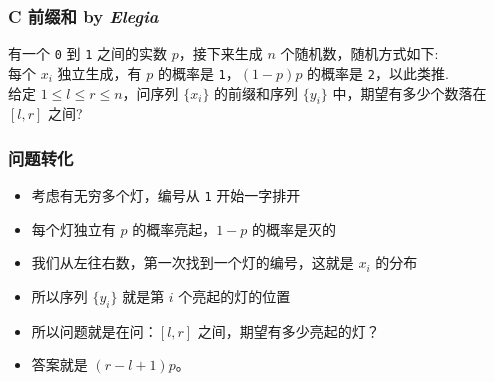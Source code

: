 \frame
{
  \frametitle{C 前缀和 {by \itshape Elegia}}

  有一个 \texttt{0} 到 \texttt{1} 之间的实数 $p$，接下来生成 $n$ 个随机数，随机方式如下:\\
  每个 $x_i$ 独立生成，有 $p$ 的概率是 \texttt{1}，$(1-p)p$ 的概率是 \texttt{2}，以此类推.\\
  给定 $1\le l\le r\le n$，问序列 $\{x_i\}$ 的前缀和序列 $\{y_i\}$ 中，期望有多少个数落在 $[l, r]$ 之间?

}


\frame
{
    \frametitle{问题转化}

  \begin{itemize}
    \item 考虑有无穷多个灯，编号从 \texttt{1} 开始一字排开
    \item 每个灯独立有 $p$ 的概率亮起，$1-p$ 的概率是灭的
    \item 我们从左往右数，第一次找到一个灯的编号，这就是 $x_i$ 的分布
    \item 所以序列 $\{y_i\}$ 就是第 $i$ 个亮起的灯的位置
    \item 所以问题就是在问：$[l, r]$ 之间，期望有多少亮起的灯？
    \item 答案就是 $(r-l+1)p$。
  \end{itemize}

}
